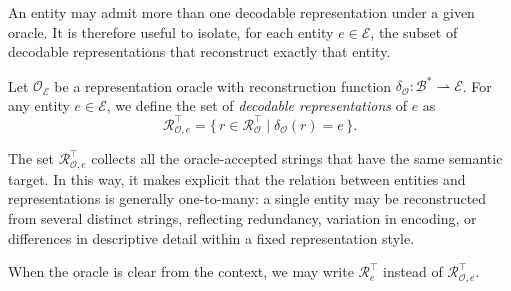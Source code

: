 An entity may admit more than one decodable representation under a given oracle. It is therefore useful to isolate, for each entity \(e \in \mathcal{E}\), the subset of decodable representations that reconstruct exactly that entity.

\begin{definition}
Let \(\mathcal{O}_{\mathcal{E}}\) be a representation oracle with reconstruction function
\(\delta_{\mathcal O} : \mathcal{B}^\ast \rightharpoonup \mathcal{E}\).
For any entity \(e \in \mathcal{E}\), we define the set of \emph{decodable representations} of \(e\) as
\[
\mathcal{R}_{\mathcal{O}, e}^{\top}
=
\{\, r \in \mathcal{R}_{\mathcal O}^{\top} \mid \delta_{\mathcal O}(r)=e \,\}.
\]
\end{definition}

The set \(\mathcal{R}_{\mathcal{O}, e}^{\top}\) collects all the oracle-accepted strings that have the same semantic target. In this way, it makes explicit that the relation between entities and representations is generally one-to-many: a single entity may be reconstructed from several distinct strings, reflecting redundancy, variation in encoding, or differences in descriptive detail within a fixed representation style.

\begin{notation}
When the oracle is clear from the context, we may write \(\mathcal{R}_{e}^{\top}\) instead of \(\mathcal{R}_{\mathcal{O}, e}^{\top}\).
\end{notation}

